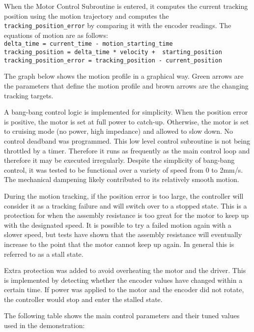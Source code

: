 When the Motor Control Subroutine is entered, it computes the current tracking position using the motion trajectory and computes the \verb|tracking_position_error| by comparing it with the encoder readings. The equations of motion are as follows: \\
{
\scriptsize
\verb|delta_time = current_time - motion_starting_time|\\
\verb|tracking_position = delta_time * velocity +  starting_position|\\
\verb|tracking_position_error = tracking_position - current_position|\\
}

The graph below shows the motion profile in a graphical way. Green arrows are the parameters that define the motion profile and brown arrows are the changing tracking targets.

A bang-bang control logic is implemented for simplicity. When the position error is positive, the motor is set at full power to catch-up. Otherwise, the motor is set to cruising mode (no power, high impedance) and allowed to slow down. No control deadband was programmed. This low level control subroutine is not being throttled by a timer. Therefore it runs as frequently as the main control loop and therefore it may be executed irregularly. Despite the simplicity of bang-bang control, it was tested to be functional over a variety of speed from 0 to 2mm/s. The mechanical dampening likely contributed to its relatively smooth motion.

During the motion tracking, if the position error is too large, the controller will consider it as a tracking failure and will switch over to a stopped state. This is a protection for when the assembly resistance is too great for the motor to keep up with the designated speed. It is possible to try a failed motion again with a slower speed, but tests have shown that the assembly resistance will eventually increase to the point that the motor cannot keep up again. In general this is referred to as a stall state. 

Extra protection was added to avoid overheating the motor and the driver. This is implemented by detecting whether the encoder values have changed within a certain time. If power was applied to the motor and the encoder did not rotate, the controller would stop and enter the stalled state. 

The following table shows the main control parameters and their tuned values used in the demonstration:

